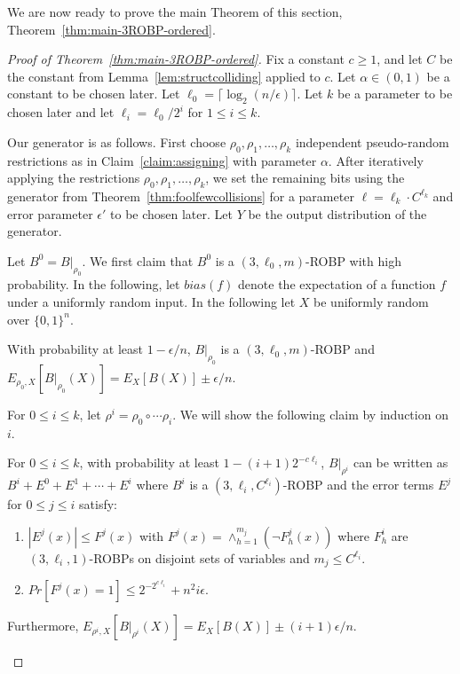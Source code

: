 We are now ready to prove the main Theorem of this section, Theorem~\ref{thm:main-3ROBP-ordered}.
\begin{proof}[Proof of Theorem~\ref{thm:main-3ROBP-ordered}]
Fix a constant $c \geq 1$, and let $C$ be the constant from Lemma~\ref{lem:structcolliding} applied to $c$. Let $\alpha \in (0,1)$ be a constant to be chosen later. Let $\ell_0 = \lceil\log_2 (n/\epsilon) \rceil$. Let $k$ be a parameter to be chosen later and let $\ell_i = \ell_0/2^i$ for $1 \leq i \leq k$. 

Our generator is as follows. First choose $\rho_0, \rho_1,\ldots,\rho_k$ independent pseudo-random restrictions as in Claim~\ref{claim:assigning} with parameter $\alpha$. After iteratively applying the restrictions $\rho_0,\rho_1,\ldots,\rho_k$, we set the remaining bits using the generator from Theorem~\ref{thm:foolfewcollisions} for a parameter $\ell = \ell_k \cdot C^{\ell_k}$ and error parameter $\epsilon'$ to be chosen later. Let $Y$ be the output distribution of the generator. 

Let $B^0 = B|_{\rho_0}$. We first claim that $B^0$ is a $(3,\ell_0,m)$-ROBP with high probability. In the following, let $bias(f)$ denote the expectation of a function $f$ under a uniformly random input. In the following let $X$ be uniformly random over $\{0,1\}^n$. 
\begin{claim}\label{claim:main1}
With probability at least $1-\epsilon/n$, $B|_{\rho_0}$ is a $(3,\ell_0,m)$-ROBP and $E_{\rho_0,X}[B|_{\rho_0}(X)] = E_X[B(X)] \pm \epsilon/n$. 
\end{claim}

For $0 \leq i \leq k$, let $\rho^i = \rho_0 \circ \cdots \rho_i$. We will show the following claim by induction on $i$.
\begin{claim}\label{claim:main2}
For $0 \leq i \leq k$, with probability at least $1- (i+1) 2^{-c \ell_i}$, $B|_{\rho^i}$ can be written as $B^i + E^0 + E^1 + \cdots + E^i$ where $B^i$ is a $(3,\ell_i,C^{\ell_i})$-ROBP and the error terms $E^j$ for $0 \leq j \leq i$ satisfy:
\begin{enumerate}
\item $|E^j(x)| \leq F^j(x)$ with $F^j(x) = \wedge_{h=1}^{m_j} (\neg F_h^j(x))$ where $F_h^i$ are $(3,\ell_i,1)$-ROBPs on disjoint sets of variables and $m_j \leq C^{\ell_i}$. 
\item $Pr[F^j(x) = 1] \leq 2^{-2^{c\ell_i}} + n^2 i \epsilon$.
\end{enumerate}

Furthermore, $E_{\rho^i,X}[B|_{\rho^i}(X)] = E_X[B(X)] \pm (i+1) \epsilon/n$. 
\end{claim}


\end{proof}
